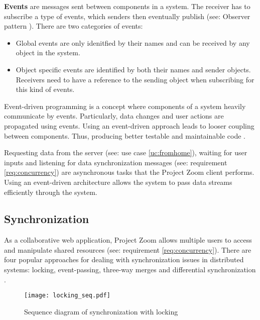 \textbf{Events} are messages sent between components in a system. The receiver has to subscribe a type of events, which senders then eventually publish (see: Observer pattern \cite{Gamma_1994}). There are two categories of events:
\begin{itemize}
\item Global events are only idenitfied by their names and can be received by any object in the system.
\item Object specific events are identified by both their names and sender objects. Receivers need to have a reference to the sending object when subscribing for this kind of events.
\end{itemize}

Event-driven programming is a concept where components of a system heavily communicate by events. Particularly, data changes and user actions are propagated using events. Using an event-driven approach leads to looser coupling between components. Thus, producing better testable and maintainable code \cite{Faison_2011}.

Requesting data from the server (see: use case \ref{uc:fromhome}), waiting for user inputs and listening for data synchronization messages (see: requirement \ref{req:concurrency}) are asynchronous tasks that the Project Zoom client performs. Using an event-driven architecture allows the system to pass data streams efficiently through the system.

\subsection{Synchronization}
As a collaborative web application, Project Zoom allows multiple users to access and manipulate shared resources (see: requirement \ref{req:concurrency}). There are four popular approaches for dealing with synchronization issues in distributed systems: locking, event-passing, three-way merges and differential synchronization \cite{Fraser_2009}.

\begin{figure}[!h]
\begin{center}
\texttt{[image: locking\_seq.pdf]}
\caption{Sequence diagram of synchronization with locking}
\label{fig:locking}
\end{center}
\end{figure}

